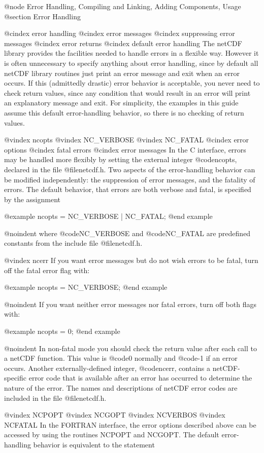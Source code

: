 @node Error Handling, Compiling and Linking, Adding Components, Usage
@section Error Handling

@cindex error handling
@cindex error messages
@cindex suppressing error messages
@cindex error returns
@cindex default error handling
The netCDF library provides the facilities needed
to handle errors in a flexible way.
However it is often unnecessary to specify anything about error handling,
since by default all netCDF library
routines just print an error message and exit when an error occurs.
If this (admittedly drastic) error behavior is acceptable, you
never need to check return values, since any condition that would result
in an error will print an explanatory message and exit.  For simplicity,
the examples in
this guide assume this default error-handling behavior, so there is no
checking of return values.

@vindex ncopts
@vindex NC_VERBOSE
@vindex NC_FATAL
@cindex error options
@cindex fatal errors
@cindex error messages
In the C interface, errors may be handled more flexibly by setting the
external integer @code{ncopts}, declared in the file @file{netcdf.h}.
Two aspects of the error-handling behavior can be modified
independently: the suppression of error messages, and the fatality of
errors.  The default behavior, that errors are both verbose and fatal,
is specified by the assignment

@example
ncopts = NC_VERBOSE | NC_FATAL;
@end example

@noindent
where @code{NC_VERBOSE} and @code{NC_FATAL} are predefined constants
from the include file @file{netcdf.h}.

@vindex ncerr
If you want error messages but do not wish errors to be fatal, turn off
the fatal error flag with:

@example
ncopts = NC_VERBOSE;
@end example

@noindent
If you want neither error messages nor fatal errors, turn off both flags
with:

@example
ncopts = 0;
@end example

@noindent
In non-fatal mode you should check the return value after each call to a
netCDF function.
This value is @code{0} normally and @code{-1} if an error occurs.
Another externally-defined integer,
@code{ncerr}, contains a netCDF-specific error code that is available
after an error has occurred to determine the nature of the error.
The names and descriptions of netCDF error codes are included in
the file @file{netcdf.h}.

@vindex NCPOPT
@vindex NCGOPT
@vindex NCVERBOS
@vindex NCFATAL
In the FORTRAN interface, the error options described above can
be accessed by using the routines NCPOPT and NCGOPT.  The default error-
handling behavior is equivalent to the statement

